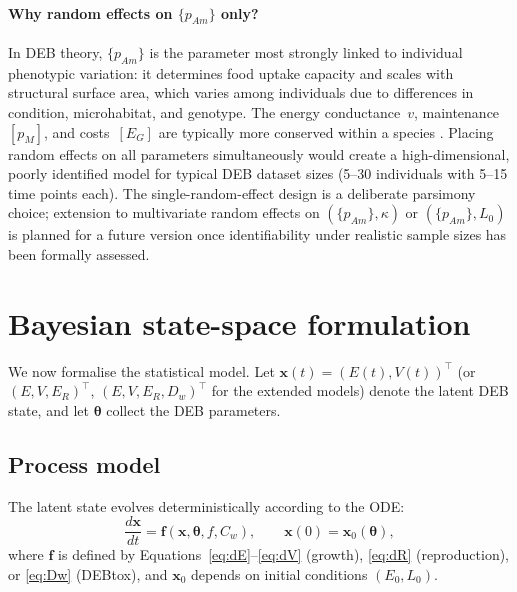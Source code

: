 \documentclass[article,shortnames]{jss}
\newcommand{\pAm}{\{p_{Am}\}}
\newcommand{\pM}{[p_M]}
\newcommand{\EG}{[E_G]}
\begin{document}
\paragraph{Why random effects on $\pAm$ only?}
In DEB theory, $\pAm$ is the parameter most strongly linked to
individual phenotypic variation: it determines food uptake capacity and
scales with structural surface area, which varies among individuals
due to differences in condition, microhabitat, and genotype.  The
energy conductance~$v$, maintenance~$\pM$, and costs~$\EG$ are
typically more conserved within a species \citep{Kooijman2010,
MarquesAmP2018}.  Placing random effects on all parameters
simultaneously would create a high-dimensional, poorly identified
model for typical DEB dataset sizes (5--30 individuals with 5--15
time points each).  The single-random-effect design is a deliberate
parsimony choice; extension to multivariate random effects on
$(\pAm, \kappa)$ or $(\pAm, L_0)$ is planned for a future version
once identifiability under realistic sample sizes has been formally
assessed.


\section{Bayesian state-space formulation} \label{sec:statespace}

We now formalise the statistical model.  Let $\mathbf{x}(t) = (E(t),
V(t))^\top$ (or $(E, V, E_R)^\top$, $(E, V, E_R, D_w)^\top$ for the
extended models) denote the latent DEB state, and let
$\boldsymbol{\theta}$ collect the DEB parameters.

\subsection{Process model}

The latent state evolves deterministically according to the ODE:
\begin{equation}
  \frac{d\mathbf{x}}{dt} = \mathbf{f}(\mathbf{x}, \boldsymbol{\theta},
  f, C_w), \qquad \mathbf{x}(0) = \mathbf{x}_0(\boldsymbol{\theta}),
  \label{eq:ode_general}
\end{equation}
where $\mathbf{f}$ is defined by
Equations~\eqref{eq:dE}--\eqref{eq:dV} (growth),
\eqref{eq:dR} (reproduction), or \eqref{eq:Dw} (DEBtox), and
$\mathbf{x}_0$ depends on initial conditions $(E_0, L_0)$.
\end{document}
